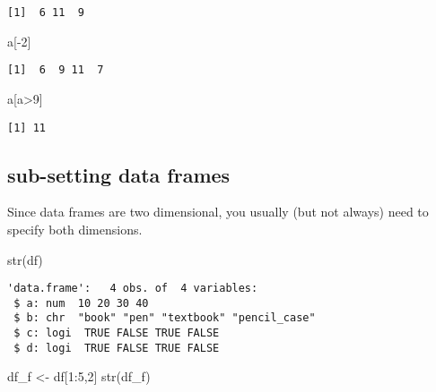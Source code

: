 \documentclass[
  letterpaper,
  DIV=11,
  numbers=noendperiod]{scrreprt}
\newenvironment{Shaded}{\begin{snugshade}}{\end{snugshade}}
\newcommand{\DecValTok}[1]{\textcolor[rgb]{0.68,0.00,0.00}{#1}}
\newcommand{\FunctionTok}[1]{\textcolor[rgb]{0.28,0.35,0.67}{#1}}
\newcommand{\NormalTok}[1]{\textcolor[rgb]{0.00,0.23,0.31}{#1}}
\newcommand{\OtherTok}[1]{\textcolor[rgb]{0.00,0.23,0.31}{#1}}
\newcommand{\SpecialCharTok}[1]{\textcolor[rgb]{0.37,0.37,0.37}{#1}}
\begin{document}
\begin{verbatim}
[1]  6 11  9
\end{verbatim}

\begin{Shaded}
\begin{Highlighting}[]
\NormalTok{a[}\SpecialCharTok{{-}}\DecValTok{2}\NormalTok{]}
\end{Highlighting}
\end{Shaded}

\begin{verbatim}
[1]  6  9 11  7
\end{verbatim}

\begin{Shaded}
\begin{Highlighting}[]
\NormalTok{a[a}\SpecialCharTok{\textgreater{}}\DecValTok{9}\NormalTok{]}
\end{Highlighting}
\end{Shaded}

\begin{verbatim}
[1] 11
\end{verbatim}

\subsection{sub-setting data frames}\label{sub-setting-data-frames}

Since data frames are two dimensional, you usually (but not always) need
to specify both dimensions.

\begin{Shaded}
\begin{Highlighting}[]
\FunctionTok{str}\NormalTok{(df)}
\end{Highlighting}
\end{Shaded}

\begin{verbatim}
'data.frame':   4 obs. of  4 variables:
 $ a: num  10 20 30 40
 $ b: chr  "book" "pen" "textbook" "pencil_case"
 $ c: logi  TRUE FALSE TRUE FALSE
 $ d: logi  TRUE FALSE TRUE FALSE
\end{verbatim}

\begin{Shaded}
\begin{Highlighting}[]
\NormalTok{df\_f }\OtherTok{\textless{}{-}}\NormalTok{ df[}\DecValTok{1}\SpecialCharTok{:}\DecValTok{5}\NormalTok{,}\DecValTok{2}\NormalTok{]}
\FunctionTok{str}\NormalTok{(df\_f)}
\end{Highlighting}
\end{Shaded}
\end{document}
